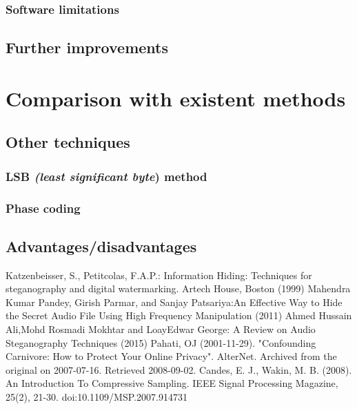 \documentclass[12 pct]{report}
\begin{document}
\subsection{Software limitations}

\section{Further improvements}

\chapter{Comparison with existent methods}
\section{Other techniques}
\subsection{LSB \emph{(least significant byte}) method}
\subsection{Phase coding}
\section{Advantages/disadvantages}



\begin{thebibliography}{3}
Katzenbeisser, S., Petitcolas, F.A.P.: Information Hiding: Techniques for steganography 
and digital watermarking. Artech House, Boston (1999) 
Mahendra Kumar Pandey, Girish Parmar, and Sanjay Patsariya:An Effective Way to Hide the Secret Audio File Using 
High Frequency Manipulation (2011)
Ahmed Hussain Ali,Mohd Rosmadi Mokhtar and LoayEdwar George: A Review on Audio Steganography Techniques (2015)
Pahati, OJ (2001-11-29). "Confounding Carnivore: How to Protect Your Online Privacy". AlterNet. Archived from the original on 2007-07-16. Retrieved 2008-09-02.
Candes, E. J., Wakin, M. B. (2008). An Introduction To Compressive Sampling. IEEE Signal Processing Magazine, 25(2), 21-30. doi:10.1109/MSP.2007.914731
\end{thebibliography}
\end{document}
